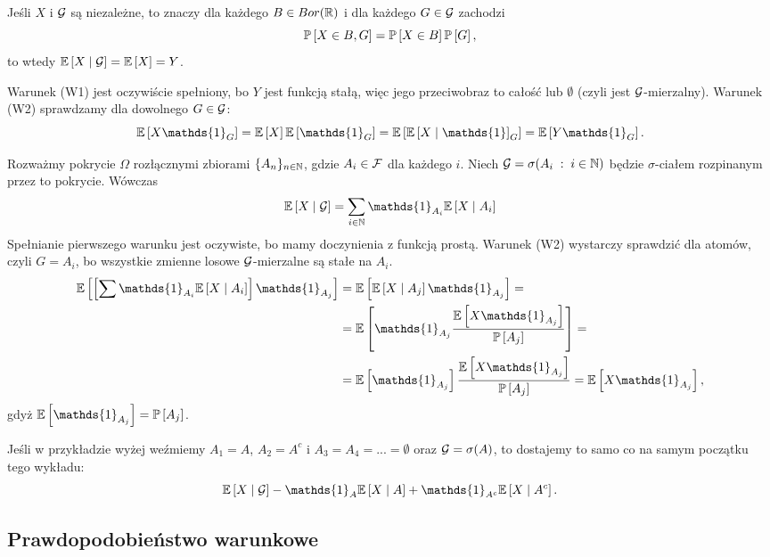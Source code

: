 \begin{example}
\item Jeśli $X$ i $\mathcal{G}$ są niezależne, to znaczy dla każdego $B\in Bor(\operatorname{\mathbb{R}})$ i dla każdego $G\in\mathcal{G}$ zachodzi
  $$\prob{X\in B, G}=\prob{X\in B}\prob{G},$$
  to wtedy $\expected{X}{\set{G}}=\expected{X}=Y$.

  Warunek (W1) jest oczywiście spełniony, bo $Y$ jest funkcją stałą, więc jego przeciwobraz to całość lub $\emptyset$ (czyli jest $\mathcal{G}$-mierzalny). Warunek (W2) sprawdzamy dla dowolnego $G\in\mathcal{G}$:
  $$\expected{X\mathds{1}_G}=\expected{X}\expected{\mathds{1}_G}=\expected{\expected{X}\mathds{1}_G}=\expected{Y\mathds{1}_G}.$$

\item Rozważmy pokrycie $\Omega$ rozłącznymi zbiorami $\{A_n\}_{n\in\operatorname{\mathbb{N}}}$, gdzie $A_i\in\mathcal{F}$ dla każdego $i$. Niech $\mathcal{G}=\sigma(A_i\;:\;i\in\operatorname{\mathbb{N}})$ będzie $\sigma$-ciałem rozpinanym przez to pokrycie. Wówczas
  $$\expected{X}{\set{G}}=\sum_{i\in\N}\mathds{1}_{A_i}\expected{X}{A_i}$$
  Spełnianie pierwszego warunku jest oczywiste, bo mamy doczynienia z funkcją prostą. Warunek (W2) wystarczy sprawdzić dla atomów, czyli $G=A_i$, bo wszystkie zmienne losowe $\mathcal{G}$-mierzalne są stałe na $A_i$.
  \begin{align*}
    \expected{\left[\sum\mathds{1}_{A_i}\expected{X}{A_i}\right]\mathds{1}_{A_j}}&=\expected{\expected{X}{A_j}\mathds{1}_{A_j}}=\\
                                                                                 &=\expected{\mathds{1}_{A_j}\frac{\expected{X\mathds{1}_{A_j}}}{\prob{A_j}}}=\\
                                                                                 &=\expected{\mathds{1}_{A_j}}\frac{\expected{X\mathds{1}_{A_j}}}{\prob{A_j}}=\expected{X\mathds{1}_{A_j}},
  \end{align*}
  gdyż $\expected{\mathds{1}_{A_j}}=\prob{A_j}$.
\item Jeśli w przykładzie wyżej weźmiemy $A_1=A$, $A_2=A^c$ i $A_3=A_4=...=\emptyset$ oraz $\mathcal{G}=\sigma(A)$, to dostajemy to samo co na samym początku tego wykładu:
  $$\expected{X}{\set{G}}-\mathds{1}_A\expected{X}{A}+\mathds{1}_{A^c}\expected{X}{A^c}.$$
\end{example}

\subsection{Prawdopodobieństwo warunkowe}

